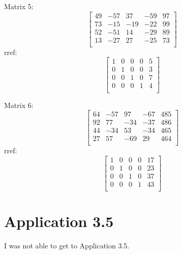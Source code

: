 \documentclass{article}
\begin{document}
\begin{flushleft}
Matrix 5:
\[ 
\begin{bmatrix} 
49  & -57  & 37  & -59  & 97 \\
73  & -15  & -19  & -22  & 99 \\
52  & -51  & 14  & -29  & 89 \\
13  & -27  & 27  & -25  & 73 \\
\end{bmatrix} 
 \]
rref:
\[ 
\begin{bmatrix} 
1  & 0  & 0  & 0  & 5 \\
0  & 1  & 0  & 0  & 3 \\
0  & 0  & 1  & 0  & 7 \\
0  & 0  & 0  & 1  & 4 \\
\end{bmatrix} 
 \]


Matrix 6:
\[ 
\begin{bmatrix} 
64  & -57  & 97  & -67  & 485 \\
92  & 77  & -34  & -37  & 486 \\
44  & -34  & 53  & -34  & 465 \\
27  & 57  & -69  & 29  & 464 \\
\end{bmatrix} 
 \]
rref:
\[ 
\begin{bmatrix} 
1  & 0  & 0  & 0  & 17 \\
0  & 1  & 0  & 0  & 23 \\
0  & 0  & 1  & 0  & 37 \\
0  & 0  & 0  & 1  & 43 \\
\end{bmatrix} 
 \]


\section*{Application 3.5}
I was not able to get to Application 3.5.


\end{flushleft}
\end{document}
